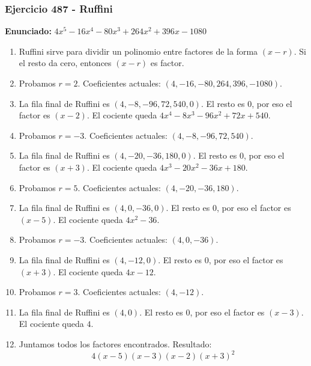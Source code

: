 \documentclass[11pt,a4paper]{article}
\begin{document}
\subsubsection*{Ejercicio 487 - Ruffini}
\textbf{Enunciado:} $ 4 x^{5} - 16 x^{4} - 80 x^{3} + 264 x^{2} + 396 x - 1080 $\par
\begin{enumerate}[leftmargin=2em]
\item Ruffini sirve para dividir un polinomio entre factores de la forma \((x-r)\). Si el resto da cero, entonces \((x-r)\) es factor.
\item Probamos \(r=2\). Coeficientes actuales: \((4, -16, -80, 264, 396, -1080)\).
\item La fila final de Ruffini es \((4, -8, -96, 72, 540, 0)\). El resto es \(0\), por eso el factor es \((x-2)\). El cociente queda \(4 x^{4} - 8 x^{3} - 96 x^{2} + 72 x + 540\).
\item Probamos \(r=-3\). Coeficientes actuales: \((4, -8, -96, 72, 540)\).
\item La fila final de Ruffini es \((4, -20, -36, 180, 0)\). El resto es \(0\), por eso el factor es \((x+3)\). El cociente queda \(4 x^{3} - 20 x^{2} - 36 x + 180\).
\item Probamos \(r=5\). Coeficientes actuales: \((4, -20, -36, 180)\).
\item La fila final de Ruffini es \((4, 0, -36, 0)\). El resto es \(0\), por eso el factor es \((x-5)\). El cociente queda \(4 x^{2} - 36\).
\item Probamos \(r=-3\). Coeficientes actuales: \((4, 0, -36)\).
\item La fila final de Ruffini es \((4, -12, 0)\). El resto es \(0\), por eso el factor es \((x+3)\). El cociente queda \(4 x - 12\).
\item Probamos \(r=3\). Coeficientes actuales: \((4, -12)\).
\item La fila final de Ruffini es \((4, 0)\). El resto es \(0\), por eso el factor es \((x-3)\). El cociente queda \(4\).
\item Juntamos todos los factores encontrados. Resultado: \[\boxed{4 \left(x - 5\right) \left(x - 3\right) \left(x - 2\right) \left(x + 3\right)^{2}}\]
\end{enumerate}

\vspace{0.2cm}
\end{document}
